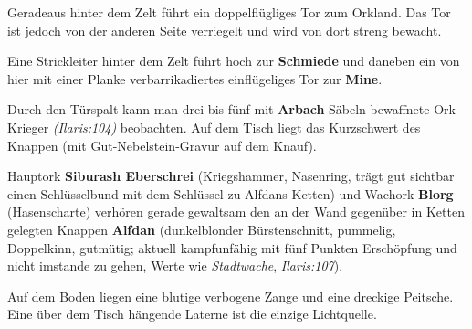 
Geradeaus hinter dem Zelt führt ein doppelflügliges Tor zum Orkland.
Das Tor ist jedoch von der anderen Seite verriegelt und wird von dort streng bewacht.

Eine Strickleiter hinter dem Zelt führt hoch zur \textbf{Schmiede} und daneben ein von hier mit einer Planke verbarrikadiertes einflügeliges Tor zur \textbf{Mine}.



Durch den Türspalt kann man drei bis fünf mit \textbf{Arbach}-Säbeln bewaffnete Ork-Krieger \emph{(Ilaris:104)} beobachten. Auf dem Tisch liegt das Kurzschwert des Knappen (mit Gut-Nebelstein-Gravur auf dem Knauf).

Hauptork \textbf{Siburash Eberschrei} (Kriegshammer, Nasenring, trägt gut sichtbar einen Schlüsselbund mit dem Schlüssel zu Alfdans Ketten) und Wachork \textbf{Blorg} (Hasenscharte) verhören gerade gewaltsam den an der Wand gegenüber in Ketten gelegten Knappen \textbf{Alfdan} (dunkelblonder Bürstenschnitt, pummelig, Doppelkinn, gutmütig; aktuell kampfunfähig mit fünf Punkten Erschöpfung und nicht imstande zu gehen, Werte wie \emph{Stadtwache}, \emph{Ilaris:107}).



Auf dem Boden liegen eine blutige verbogene Zange und eine dreckige Peitsche.
Eine über dem Tisch hängende Laterne ist die einzige Lichtquelle.

